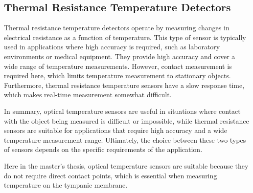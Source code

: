 \subsection{Thermal Resistance Temperature Detectors}
\label{Background:TemperatureSensors:ResistanceTD}
Thermal resistance temperature detectors operate by measuring changes in electrical resistance as a function of temperature. 
This type of sensor is typically used in applications where high accuracy is required, such as laboratory environments or medical equipment.
They provide high accuracy and cover a wide range of temperature measurements.
However, contact measurement is required here, which limits temperature measurement to stationary objects.
Furthermore, thermal resistance temperature sensors have a slow response time, which makes real-time measurement somewhat difficult.

In summary, optical temperature sensors are useful in situations where contact with the object being measured is difficult or impossible, while thermal resistance sensors are suitable for applications that require high accuracy and a wide temperature measurement range. 
Ultimately, the choice between these two types of sensors depends on the specific requirements of the application.

Here in the master's thesis, optical temperature sensors are suitable because they do not require direct contact points, which is essential when measuring temperature on the tympanic membrane.

